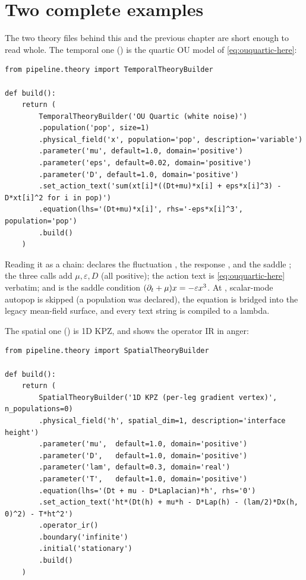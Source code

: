 \section{Two complete examples}

The two theory files behind this and the previous chapter are short enough to read
whole. The temporal one () is the quartic OU
model of \eqref{eq:ouquartic-here}:

\begin{lstlisting}
from pipeline.theory import TemporalTheoryBuilder

def build():
    return (
        TemporalTheoryBuilder('OU Quartic (white noise)')
        .population('pop', size=1)
        .physical_field('x', population='pop', description='variable')
        .parameter('mu', default=1.0, domain='positive')
        .parameter('eps', default=0.02, domain='positive')
        .parameter('D', default=1.0, domain='positive')
        .set_action_text('sum(xt[i]*((Dt+mu)*x[i] + eps*x[i]^3) - D*xt[i]^2 for i in pop)')
        .equation(lhs='(Dt+mu)*x[i]', rhs='-eps*x[i]^3', population='pop')
        .build()
    )
\end{lstlisting}

Reading it as a chain:  declares the fluctuation
, the response , and the saddle ; the three
 calls add $\mu,\varepsilon,D$ (all positive); the action
text is \eqref{eq:ouquartic-here} verbatim; and  is the
saddle condition $(\partial_t+\mu)x = -\varepsilon x^{3}$. At ,
scalar-mode autopop is skipped (a  population was declared), the
equation is bridged into the legacy mean-field surface, and every text string is
compiled to a lambda.

The spatial one () is 1D KPZ, and shows the
operator IR in anger:

\begin{lstlisting}
from pipeline.theory import SpatialTheoryBuilder

def build():
    return (
        SpatialTheoryBuilder('1D KPZ (per-leg gradient vertex)', n_populations=0)
        .physical_field('h', spatial_dim=1, description='interface height')
        .parameter('mu',  default=1.0, domain='positive')
        .parameter('D',   default=1.0, domain='positive')
        .parameter('lam', default=0.3, domain='real')
        .parameter('T',   default=1.0, domain='positive')
        .equation(lhs='(Dt + mu - D*Laplacian)*h', rhs='0')
        .set_action_text('ht*(Dt(h) + mu*h - D*Lap(h) - (lam/2)*Dx(h, 0)^2) - T*ht^2')
        .operator_ir()
        .boundary('infinite')
        .initial('stationary')
        .build()
    )
\end{lstlisting}

